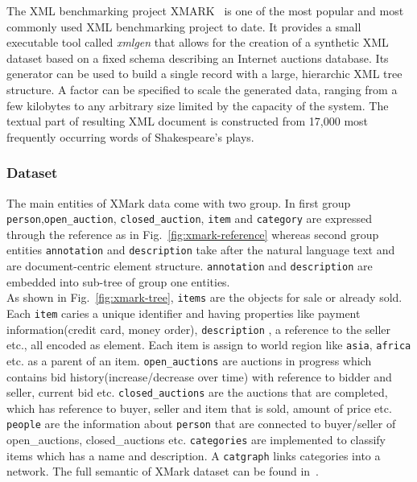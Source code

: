 The XML benchmarking project XMARK~\cite{xmark/original} is one of the most popular and most commonly used XML benchmarking project to date. It provides a small executable tool called \textit{xmlgen} that allows for the creation of a synthetic XML dataset based on a fixed schema describing an Internet auctions database. Its generator can be used to build  a single record with a large, hierarchic XML tree structure. A factor can be specified to scale the generated data, ranging from a few kilobytes to any arbitrary size limited by the capacity of the system. The textual part of resulting XML document is constructed from 17,000 most frequently occurring words of Shakespeare's plays.
\label{xmark-dataset}
\subsubsection{Dataset}
The main entities of XMark data come with two group. In first group \texttt{person},\texttt{open\_auction}, \texttt{closed\_auction}, \texttt{item} and \texttt{category} are expressed through the reference as in Fig.~\ref{fig:xmark-reference} whereas second group entities \texttt{annotation} and \texttt{description} take after the natural language text and are document-centric element structure. \texttt{annotation} and \texttt{description} are embedded into sub-tree of group one entities. 
\\
As shown in Fig.~\ref{fig:xmark-tree}, \texttt{items} are the objects for sale or already sold. Each \texttt{item} caries a unique identifier and having properties like payment information(credit card, money order), \texttt{description} , a reference to the seller etc., all encoded as element. Each item is assign to world region like \texttt{asia}, \texttt{africa} etc. as a parent of an item. \texttt{open\_auctions} are auctions in progress which contains bid history(increase/decrease over time) with reference to bidder and seller, current bid etc. \texttt{closed\_auctions} are the auctions that are completed, which has reference to buyer, seller and item that is sold, amount of price etc. \texttt{people} are the information about \texttt{person} that are connected to buyer/seller of open\_auctions, closed\_auctions etc. \texttt{categories} are implemented to classify items which has a name and description. A \texttt{catgraph} links categories into a network.  The full semantic of XMark dataset can be found in~\cite{xmark/original}.

